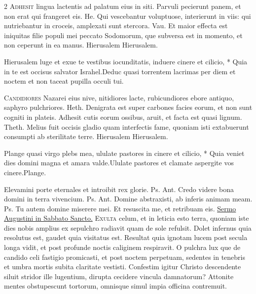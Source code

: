 \begin{multicols*}{2}
\lettrine[lines=2]{\zallmancaps \color{Blue} A}{dhesit} lingua lactentis ad palatum eius in siti. Parvuli pecierunt panem, et non erat qui frangeret eis. {\color{Red} He.} Qui vescebantur voluptuose, interierunt in viis: qui nutriebantur in croceis, amplexati sunt stercora. {\color{Red} Vau.} Et maior effecta est iniquitas filie populi mei peccato Sodomorum, que subversa est in momento, et non ceperunt in ea manus. Hierusalem Hierusalem.
\begin{responsory}
{Hierusalem luge et exue te vestibus iocunditatis, induere cinere et cilicio, * Quia in te est occisus salvator Israhel.}{Deduc quasi torrentem lacrimas per diem et noctem et non taceat pupilla occuli tui.}
\end{responsory}%
\lettrine[lines=2]{\zallmancaps \color{Red} C}{andidiores} Nazarei eius nive, nitidiores lacte, rubicundiores ebore antiquo, saphyro pulchriores. {\color{Red} Heth.} Denigrata est super carbones facies eorum, et non sunt cogniti in plateis. Adhesit cutis eorum ossibus, aruit, et facta est quasi lignum. {\color{Red} Theth.} Melius fuit occisis gladio quam interfectis fame, quoniam isti extabuerunt consumpti ab sterilitate terre. Hierusalem Hierusalem.
\begin{responsory}
{Plange quasi virgo plebs mea, ululate pastores in cinere et cilicio, * Quia veniet dies domini magna et amara valde.}{Ululate pastores et clamate aspergite vos cinere.}Plange.
\end{responsory}%
 Elevamini porte eternales et introibit rex glorie. {\color{Red} Ps.}  {\color{Red} Ant.} Credo videre bona domini in terra vivencium. {\color{Red} Ps.}  {\color{Red} Ant.} Domine abstraxisti, ab inferis animam meam. {\color{Red} Ps.}  \V Tu autem domine miserere mei. \R Et resuscita me, et retribuam eis.
\newline \ul{Sermo Augustini in Sabbato Sancto.} \grecross
\lettrine[lines=2]{\zallmancaps \color{Blue} E}{xulta} celum, et in leticia esto terra, quoniam iste dies nobis amplius ex sepulchro radiavit quam de sole refulsit. Dolet infernus quia resolutus est, gaudet quia visitatus est. Resultat quia ignotam lucem post secula longa vidit, et post profunde noctis caliginem respiravit. O pulchra lux que de candido celi fastigio promicasti, et post noctem perpetuam, sedentes in tenebris et umbra mortis subita claritate vestisti. Confestim igitur Christo descendente siluit stridor ille lugentium, dirupta cecidere vincula damnatorum? Attonite mentes obstupescunt tortorum, omnisque simul impia officina contremuit.

\end{multicols*}
